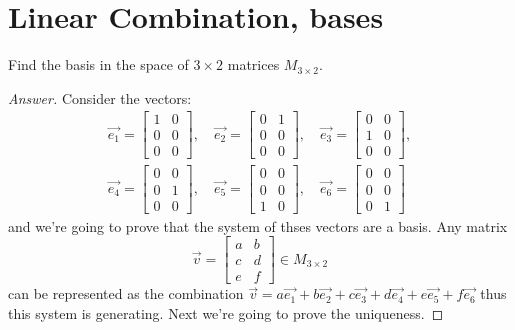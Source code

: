 \documentclass{article}
\def\by{\times}
\begin{document}
\section{Linear Combination, bases}
\begin{exercise}
  Find the basis in the space of $3\by 2$ matrices
  $M_{3\by 2}$.
\end{exercise}
\begin{proof}[Answer]
  Consider the vectors:
  \begin{align*}
    \vec{e_1}=\begin{bmatrix} 1&0\\0&0\\0&0 \end{bmatrix},\quad
    \vec{e_2}=\begin{bmatrix} 0&1\\0&0\\0&0 \end{bmatrix},\quad
    \vec{e_3}=\begin{bmatrix} 0&0\\1&0\\0&0 \end{bmatrix},\\[0.3cm]
    \vec{e_4}=\begin{bmatrix} 0&0\\0&1\\0&0 \end{bmatrix},\quad
    \vec{e_5}=\begin{bmatrix} 0&0\\0&0\\1&0 \end{bmatrix},\quad
    \vec{e_6}=\begin{bmatrix} 0&0\\0&0\\0&1 \end{bmatrix}
  \end{align*}
  and we're going to prove that the system of thses vectors are a basis.
  Any  matrix 
  \[
    \vec{v}=
    \begin{bmatrix}
      a&b\\ c&d\\ e&f
    \end{bmatrix}\in M_{3\by 2}
  \]
  can be represented as the combination
  $\vec{v}=a\vec{e_1}+b\vec{e_2}+c\vec{e_3}+d\vec{e_4}+e\vec{e_5}+f\vec{e_6}$
  thus this system is generating. Next we're going to prove the uniqueness.


\end{proof}
\end{document}
